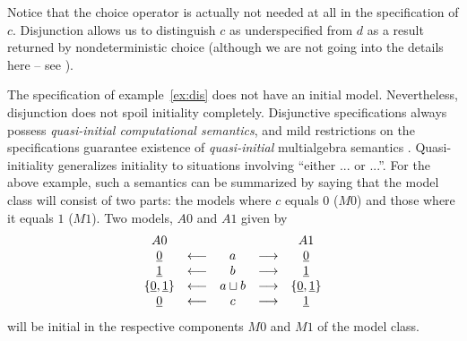 {Notice that the choice operator is actually not needed at all in the specification of $c$. Disjunction allows us 
to distinguish $c$ as underspecified from $d$ as a result returned by nondeterministic choice (although we are 
not going into the details here -- see \cite{c:127}). 

The specification of example~\ref{ex:dis} does not have an initial model. Nevertheless, disjunction does not 
spoil initiality completely. Disjunctive specifications always 
possess {\em quasi-initial computational semantics}, 
and mild restrictions on the specifications guarantee existence of 
{\em quasi-initial} multialgebra semantics 
\cite{c:127}. Quasi-initiality generalizes initiality to situations involving ``either ... or ...''. For the above example, 
such a semantics can be summarized by saying that the model class will consist of two parts: the models 
where $c$ equals $0$ ($M0$) and those where it equals $1$ ($M1$). Two 
models, $A0$ and $A1$ given by
\[ \begin{array}{ccccc}
	A0 & & & & 	A1 \\
	\underline{0} & \longleftarrow &	a & \longrightarrow & \underline{0} \\
	\underline{1} & \longleftarrow &	b & \longrightarrow & \underline{1} \\
	\{\underline{0},\underline{1}\} & \longleftarrow &	a\sqcup b & \longrightarrow & \{\underline{0},\underline{1}\} \\
	\underline{0} & \longleftarrow &	c & \longrightarrow & \underline{1} 
\end{array} \]
will be initial in the respective components $M0$ and $M1$ of the model class.

}
